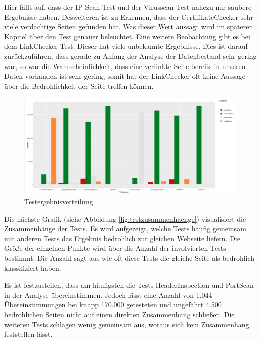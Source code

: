 Hier fällt auf, dass der IP-Scan-Test und der Virusscan-Test nahezu nur saubere Ergebnisse haben. Desweiteren ist zu Erkennen, dass der CertifikateChecker sehr viele verdächtige Seiten gefunden hat. Was dieser Wert aussagt wird im späteren Kapitel über den Test genauer beleuchtet. Eine weitere Beobachtung gibt es bei dem LinkChecker-Test. Dieser hat viele unbekannte Ergebnisse. Dies ist darauf zurückzuführen, dass gerade zu Anfang der Analyse der Datenbestand sehr gering war, so war die Wahrscheinlichkeit, dass eine verlinkte Seite bereits in unseren Daten vorhanden ist sehr gering, somit hat der LinkChecker oft keine Aussage über die Bedrohlichkeit der Seite treffen können.
\begin{figure}[H]
  \centering
  \includegraphics[width=15cm]{images/stats/ergebnisverteilung}
  \caption{Testergebnisverteilung\protect\footnotemark}
  \label{fig:ergebnisverteilung}
\end{figure}

Die nächste Grafik (siehe Abbildung \ref{fig:testzusammenhaenge}) visualisiert die Zusammenhänge der Tests. Es wird aufgezeigt, welche Tests häufig gemeinsam mit anderen Tests das Ergebnis bedrohlich zur gleichen Webseite liefern. Die Größe der einzelnen Punkte wird über die Anzahl der involvierten Tests bestimmt. Die Anzahl sagt aus wie oft diese Tests die gleiche Seite als bedrohlich klassifiziert haben.

Es ist festzustellen, dass am häufigsten die Tests HeaderInspection und PortScan in der Analyse übereinstimmen. Jedoch lässt eine Anzahl von 1.044 Übereinstimmungen bei knapp 170.000 getesteten und ungefährt 4.500 bedrohlichen Seiten nicht auf einen direkten Zusammenhang schließen. Die weiteren Tests schlagen wenig gemeinsam aus, woraus sich kein Zusammenhang feststellen lässt.

